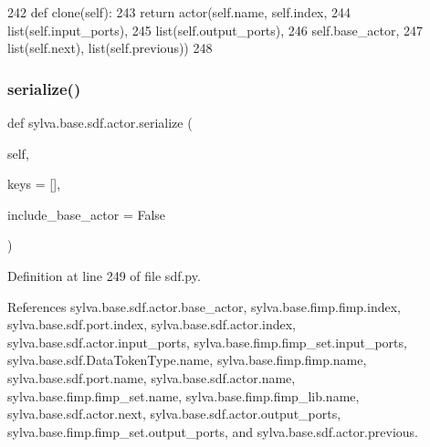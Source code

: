 \begin{DoxyCode}
242         \textcolor{keyword}{def }clone(self):
243             \textcolor{keywordflow}{return} actor(self.name, self.index,
244                          list(self.input\_ports),
245                          list(self.output\_ports),
246                          self.base\_actor,
247                          list(self.next), list(self.previous))
248 
\end{DoxyCode}
\mbox{\label{classsylva_1_1base_1_1sdf_1_1actor_abad5148eadd915c067c20ee575f56e1e}} 
\subsubsection{\texorpdfstring{serialize()}{serialize()}}
{\footnotesize\ttfamily def sylva.\+base.\+sdf.\+actor.\+serialize (\begin{DoxyParamCaption}\item[{}]{self,  }\item[{}]{keys = {\ttfamily \mbox{[}\mbox{]}},  }\item[{}]{include\+\_\+base\+\_\+actor = {\ttfamily False} }\end{DoxyParamCaption})}



Definition at line 249 of file sdf.\+py.



References sylva.\+base.\+sdf.\+actor.\+base\+\_\+actor, sylva.\+base.\+fimp.\+fimp.\+index, sylva.\+base.\+sdf.\+port.\+index, sylva.\+base.\+sdf.\+actor.\+index, sylva.\+base.\+sdf.\+actor.\+input\+\_\+ports, sylva.\+base.\+fimp.\+fimp\+\_\+set.\+input\+\_\+ports, sylva.\+base.\+sdf.\+Data\+Token\+Type.\+name, sylva.\+base.\+fimp.\+fimp.\+name, sylva.\+base.\+sdf.\+port.\+name, sylva.\+base.\+sdf.\+actor.\+name, sylva.\+base.\+fimp.\+fimp\+\_\+set.\+name, sylva.\+base.\+fimp.\+fimp\+\_\+lib.\+name, sylva.\+base.\+sdf.\+actor.\+next, sylva.\+base.\+sdf.\+actor.\+output\+\_\+ports, sylva.\+base.\+fimp.\+fimp\+\_\+set.\+output\+\_\+ports, and sylva.\+base.\+sdf.\+actor.\+previous.


